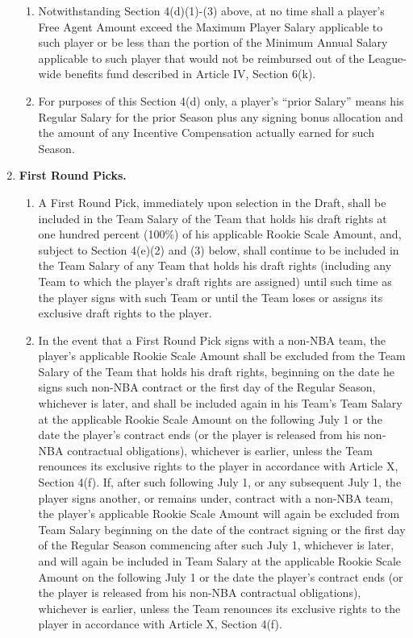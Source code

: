 \documentclass[
]{book}
\providecommand{\tightlist}{%
  \setlength{\itemsep}{0pt}\setlength{\parskip}{0pt}}
\begin{document}
\begin{enumerate}
\begin{enumerate}
  \item
    Notwithstanding Section 4(d)(1)-(3) above, at no time shall a player's Free Agent Amount exceed the Maximum Player Salary applicable to such player or be less than the portion of the Minimum Annual Salary applicable to such player that would not be reimbursed out of the League-wide benefits fund described in Article IV, Section 6(k).
  \item
    For purposes of this Section 4(d) only, a player's ``prior Salary'' means his Regular Salary for the prior Season plus any signing bonus allocation and the amount of any Incentive Compensation actually earned for such Season.
  \end{enumerate}
\item
  \textbf{First Round Picks.}

  \begin{enumerate}
  \def\labelenumii{(\arabic{enumii})}
  \tightlist
  \item
    A First Round Pick, immediately upon selection in the Draft, shall be included in the Team Salary of the Team that holds his draft rights at one hundred percent (100\%) of his applicable Rookie Scale Amount, and, subject to Section 4(e)(2) and (3) below, shall continue to be included in the Team Salary of any Team that holds his draft rights (including any Team to which the player's draft rights are assigned) until such time as the player signs with such Team or until the Team loses or assigns its exclusive draft rights to the player.
  \item
    In the event that a First Round Pick signs with a non-NBA team, the player's applicable Rookie Scale Amount shall be excluded from the Team Salary of the Team that holds his draft rights, beginning on the date he signs such non-NBA contract or the first day of the Regular Season, whichever is later, and shall be included again in his Team's Team Salary at the applicable Rookie Scale Amount on the following July 1 or the date the player's contract ends (or the player is released from his non-NBA contractual obligations), whichever is earlier, unless the Team renounces its exclusive rights to the player in accordance with Article X, Section 4(f). If, after such following July 1, or any subsequent July 1, the player signs another, or remains under, contract with a non-NBA team, the player's applicable Rookie Scale Amount will again be excluded from Team Salary beginning on the date of the contract signing or the first day of the Regular Season commencing after such July 1, whichever is later, and will again be included in Team Salary at the applicable Rookie Scale Amount on the following July 1 or the date the player's contract ends (or the player is released from his non-NBA contractual obligations), whichever is earlier, unless the Team renounces its exclusive rights to the player in accordance with Article X, Section 4(f).

\end{enumerate}
\end{enumerate}
\end{document}
